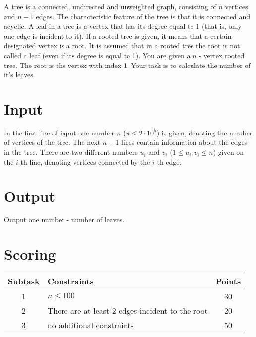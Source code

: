 \documentclass[en]{spiral}
\begin{document}
    \makeheader

    \noindent A tree is a connected, undirected and unweighted graph,
    consisting of $n$ vertices and $n-1$ edges.
    The characteristic feature of the tree is that it is connected and acyclic.
    A leaf in a tree is a vertex that has its degree equal to 1
    (that is, only one edge is incident to it).
    If a rooted tree is given, it means that a certain designated vertex is a root.
    It is assumed that in a rooted tree the root is not called a leaf
    (even if its degree is equal to 1).
    You are given a $n$ - vertex rooted tree.
    The root is the vertex with index 1.
    Your task is to calculate the number of it's leaves.

\section{Input}

    In the first line of input one number $n$ ($n \leq 2 \cdot 10^5$) is given,
    denoting the number of vertices of the tree.
    The next $n-1$ lines contain information about the edges in the tree.
    There are two different numbers $u_i$ and $v_i$ ($1 \leq u_i, v_i \leq n$)
    given on the $i$-th line, denoting vertices connected by the $i$-th edge.

\section{Output}

    Output one number - number of leaves.


\section{Scoring}

    \begin{center}
        \begin{tabular}{|c|p{5cm}|c|}
            \hline
            \textbf{Subtask} & \textbf{Constraints} & \textbf{Points} \\
            \hline
            1 & $n \leq 100$ & 30 \\
            \hline
            2 & There are at least 2 edges incident to the root & 20 \\
            \hline
            3 & no additional constraints & 50 \\
            \hline
        \end{tabular}
    \end{center}
\end{document}
